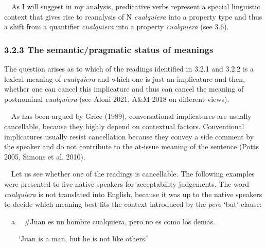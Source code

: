 \begin{styleStandard}
\ \ As I will suggest in my analysis, predicative verbs represent a special linguistic context that gives rise to reanalysis of N \textit{cualquiera} into a property type and thus a shift from a quantifier \textit{cualquiera} into a property \textit{cualquiera} (see 3.6). 
\end{styleStandard}

\subsubsection[3.2.3 The semantic/pragmatic status of meanings]{\textbf{3.2.3 The semantic/pragmatic status of }\textbf{meanings}}
\begin{styleStandard}
The question arises as to which of the readings identified in 3.2.1 and 3.2.2 is a lexical meaning of \textit{cualquiera} and which one is just an implicature and then, whether one can cancel this implicature and thus can cancel the meaning of postnominal \textit{cualquiera} (see Aloni 2021, A\&M 2018 on different views).
\end{styleStandard}

\begin{styleStandard}
\ \ As has been argued by Grice (1989), conversational implicatures are usually cancellable, because they highly depend on contextual factors. Conventional implicatures usually resist cancellation because they convey a side comment by the speaker and do not contribute to the at-issue meaning of the sentence (Potts 2005, Simons et al. 2010).
\end{styleStandard}

\begin{styleStandard}
\ \ Let us see whether one of the readings is cancellable. The following examples were presented to five native speakers for acceptability judgements. The word \textit{cualquiera} is not translated into English, because it was up to the native speakers to decide which meaning best fits the context introduced by the \textit{pero} ‘but’ clause:
\end{styleStandard}

\begin{styleStandard}
\label{bkm:Ref42976554}\ \ a.\ \ \#Juan es un hombre cualquiera, pero no es como los demás.
\end{styleStandard}

\begin{styleStandard}
\ \ \ \ ‘Juan is a man, but he is not like others.’
\end{styleStandard}

